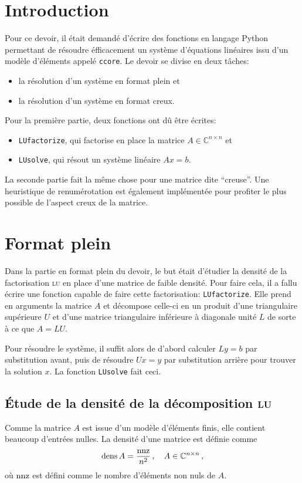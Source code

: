 \documentclass[11pt]{article}
\DeclareMathOperator{\dens}{\mathrm{dens}}
\begin{document}
\section*{Introduction}
Pour ce devoir, il était demandé d'écrire des fonctions en langage Python permettant de résoudre éfficacement un système d'équations linéaires issu d'un modèle d'éléments appelé \lstinline[language=bash]{ccore}.
Le devoir se divise en deux tâches:
\begin{itemize}
	\item la résolution d'un système en format plein et
	\item la résolution d'un système en format creux.
\end{itemize}
Pour la première partie, deux fonctions ont dû être écrites:
\begin{itemize}
	\item \lstinline|LUfactorize|, qui factorise en place la matrice $A \in \mathbb{C}^{n \times n}$ et
	\item \lstinline|LUsolve|, qui résout un système linéaire $Ax = b$.
\end{itemize}
La seconde partie fait la même chose pour une matrice dite \foreignquote{french}{creuse}.
Une heuristique de renumérotation est également implémentée pour profiter le plus possible de l'aspect creux de la matrice.

\section{Format plein}
\label{sec:dense}
Dans la partie en format plein du devoir, le but était d'étudier la densité de la factorisation \textsc{lu} en place d'une matrice de faible densité.
Pour faire cela, il a fallu écrire une fonction capable de faire cette factorisation: \lstinline|LUfactorize|.
Elle prend en arguments la matrice $A$ et décompose celle-ci en un produit d'une triangulaire supérieure $U$ et d'une matrice triangulaire inférieure à diagonale unité $L$ de sorte à ce que $A = LU$.

Pour résoudre le système, il suffit alors de d'abord calculer $Ly = b$ par substitution avant, puis de résoudre $Ux = y$ par substitution arrière pour trouver la solution $x$.
La fonction \lstinline|LUsolve| fait ceci.
\subsection{Étude de la densité de la décomposition \textsc{lu}}
\label{sec:fulldens}
Comme la matrice $A$ est issue d'un modèle d'éléments finis, elle contient beaucoup d'entrées nulles.
La densité d'une matrice est définie comme
\[
\dens A  = \frac{\textnormal{nnz}}{n^2}\,, \quad A \in \mathbb{C}^{n \times n}\,,
\]
où $\textnormal{nnz}$ est défini comme le nombre d'éléments non nuls de $A$.
\end{document}
